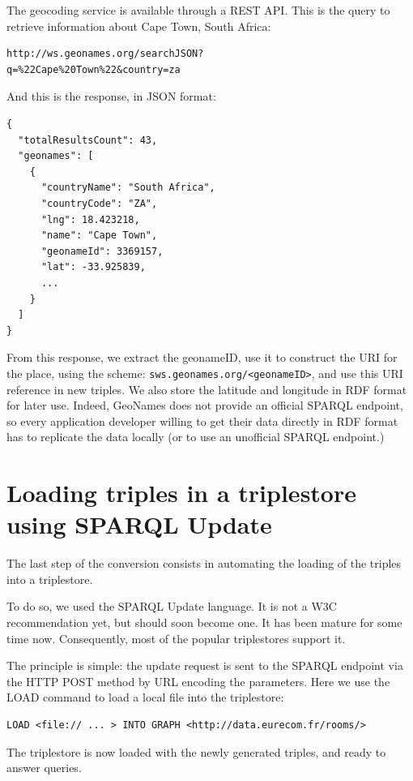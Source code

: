 \documentclass[a4paper,11pt]{report}
\begin{document}
The geocoding service is available through a REST API. This is the query to retrieve information about Cape Town, South Africa:
\begin{Verbatim}[xleftmargin=3em]
http://ws.geonames.org/searchJSON?
q=%22Cape%20Town%22&country=za
\end{Verbatim}

And this is the response, in JSON format:
\begin{Verbatim}[xleftmargin=3em]
{
  "totalResultsCount": 43,
  "geonames": [
    {
      "countryName": "South Africa",
      "countryCode": "ZA",
      "lng": 18.423218,
      "name": "Cape Town",
      "geonameId": 3369157,
      "lat": -33.925839,
      ...
    }
  ]
}
\end{Verbatim}

From this response, we extract the geonameID, use it to construct the URI for the place, using the scheme: \texttt{sws.geonames.org/<geonameID>}, and use this URI reference in new triples. We also store the latitude and longitude in RDF format for later use. Indeed, GeoNames does not provide an official SPARQL endpoint, so every application developer willing to get their data directly in RDF format has to replicate the data locally (or to use an unofficial SPARQL endpoint.)
\section{Loading triples in a triplestore using SPARQL Update}

The last step of the conversion consists in automating the loading of the triples into a triplestore.

To do so, we used the SPARQL Update language. It is not a W3C recommendation yet, but should soon become one. It has been mature for some time now. Consequently, most of the popular triplestores support it. 

The principle is simple: the update request is sent to the SPARQL endpoint via the HTTP POST method by URL encoding the parameters. Here we use the LOAD command to load a local file into the triplestore:
\begin{verbatim}
LOAD <file:// ... > INTO GRAPH <http://data.eurecom.fr/rooms/>
\end{verbatim}

The triplestore is now loaded with the newly generated triples, and ready to answer queries. 
\end{document}
